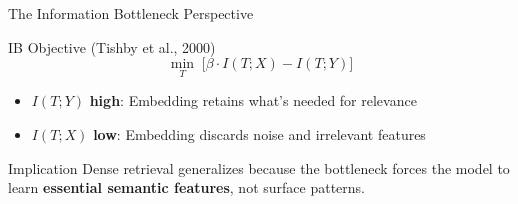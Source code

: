 \documentclass[aspectratio=169]{beamer}
\newif\ifanimated
\newcommand{\cpause}{\ifanimated\pause\fi}
\begin{document}
\begin{frame}[fragile]{The Information Bottleneck Perspective}
\begin{block}{IB Objective (Tishby et al., 2000)}
$$\min_T \;\bigl[\beta \cdot I(T; X) - I(T; Y)\bigr]$$
\end{block}

\vspace{0.5em}

\begin{center}
\end{center}

\cpause
\vspace{0.5em}

\begin{itemize}
    \item $I(T; Y)$ \textbf{high}: Embedding retains what's needed for relevance
    \item $I(T; X)$ \textbf{low}: Embedding discards noise and irrelevant features
\end{itemize}

\vspace{0.5em}

\begin{exampleblock}{Implication}
Dense retrieval generalizes because the bottleneck forces the model to learn \textbf{essential semantic features}, not surface patterns.
\end{exampleblock}
\end{frame}
\end{document}
